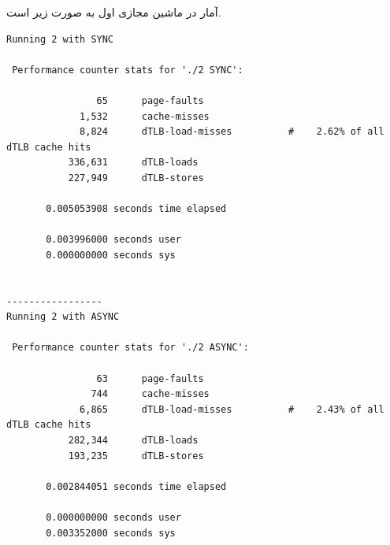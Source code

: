 \documentclass{article}
\begin{document}
آمار در ماشین مجازی اول به صورت زیر است.
\begin{latin}
\begin{lstlisting}
Running 2 with SYNC

 Performance counter stats for './2 SYNC':

                65      page-faults                                                 
             1,532      cache-misses                                                
             8,824      dTLB-load-misses          #    2.62% of all dTLB cache hits 
           336,631      dTLB-loads                                                  
           227,949      dTLB-stores                                                 

       0.005053908 seconds time elapsed

       0.003996000 seconds user
       0.000000000 seconds sys


-----------------
Running 2 with ASYNC

 Performance counter stats for './2 ASYNC':

                63      page-faults                                                 
               744      cache-misses                                                
             6,865      dTLB-load-misses          #    2.43% of all dTLB cache hits 
           282,344      dTLB-loads                                                  
           193,235      dTLB-stores                                                 

       0.002844051 seconds time elapsed

       0.000000000 seconds user
       0.003352000 seconds sys
\end{lstlisting}
\end{latin}
\end{document}
